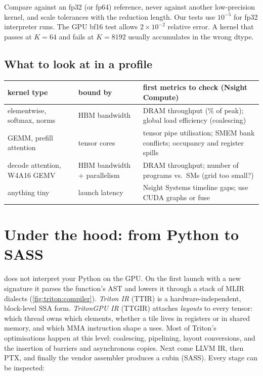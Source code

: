 \begin{pitfall}
Compare against an fp32 (or fp64) reference, never against another low-precision kernel,
and scale tolerances with the reduction length. Our tests use $10^{-5}$ for fp32
interpreter runs. The GPU bf16 test allows $2\times10^{-2}$ relative error. A kernel
that passes at $K=64$ and fails at $K=8192$ usually accumulates in the wrong dtype.
\end{pitfall}

\subsection{What to look at in a profile}
\begin{center}\small
\begin{tabularx}{\linewidth}{l>{\raggedright\arraybackslash}X>{\raggedright\arraybackslash}X}
\toprule
kernel type & bound by & first metrics to check (Nsight Compute) \\
\midrule
elementwise, softmax, norms & HBM bandwidth & DRAM throughput (\% of peak); global load efficiency (coalescing) \\
GEMM, prefill attention & tensor cores & tensor pipe utilisation; SMEM bank conflicts; occupancy and register spills \\
decode attention, W4A16 GEMV & HBM bandwidth + parallelism & DRAM throughput; number of programs vs.\ SMs (grid too small?) \\
anything tiny & launch latency & Nsight Systems timeline gaps; use CUDA graphs or fuse \\
\bottomrule
\end{tabularx}
\end{center}

\section{Under the hood: from Python to SASS}\label{sec:triton:compiler}
 does not interpret your Python on the GPU. On the first launch with
a new signature it parses the function's AST and lowers it through a stack of MLIR
dialects (\cref{fig:triton:compiler}). \emph{Triton IR} (TTIR) is a
hardware-independent, block-level SSA form. \emph{TritonGPU IR} (TTGIR) attaches
\emph{layouts} to every tensor: which thread owns which elements, whether a tile lives
in registers or in shared memory, and which MMA instruction shape a  uses.
Most of Triton's optimisations happen at this level: coalescing, pipelining,
layout conversions, and the insertion of barriers and asynchronous copies. Next come
LLVM IR, then PTX, and finally the vendor assembler produces a cubin (SASS). Every stage
can be inspected:

